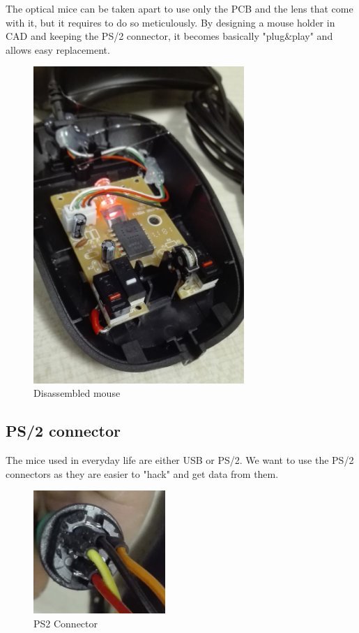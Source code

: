 \documentclass[a4paper]{article}
\begin{document}
The optical mice can be taken apart to use only the PCB and the lens that come with it, but it requires to do so meticulously. By designing a mouse holder in CAD and keeping the PS/2 connector, it becomes basically "plug\&play" and allows easy replacement.

\begin{figure}[h!]
    \centering
    \includegraphics[width = 8cm]{images/mouse.jpg}
    \caption{Disassembled mouse}
    \label{fig:mouse}
\end{figure}

\subsection{PS/2 connector}
The mice used in everyday life are either USB or PS/2.
We want to use the PS/2 connectors as they are easier to "hack" and get data from them.

\begin{figure}[h!]
    \centering
    \includegraphics[width = 5cm]{images/ps2.jpg}
    \caption{PS2 Connector}
    \label{fig:connector}
\end{figure}
\end{document}

